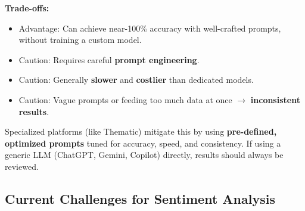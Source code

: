 \documentclass[12pt,openany]{book}
\begin{document}
\textbf{Trade-offs:}
\begin{itemize}[leftmargin=*]
    \item Advantage: Can achieve near-100\% accuracy with well-crafted prompts, without training a custom model.
    \item Caution: Requires careful \textbf{prompt engineering}.
    \item Caution: Generally \textbf{slower} and \textbf{costlier} than dedicated models.
    \item Caution: Vague prompts or feeding too much data at once \(\rightarrow\) \textbf{inconsistent results}.
\end{itemize}

Specialized platforms (like Thematic) mitigate this by using \textbf{pre-defined, optimized prompts} tuned for accuracy, speed, and consistency. If using a generic LLM (ChatGPT, Gemini, Copilot) directly, results should always be reviewed.

\subsection{Current Challenges for Sentiment Analysis}
\end{document}

